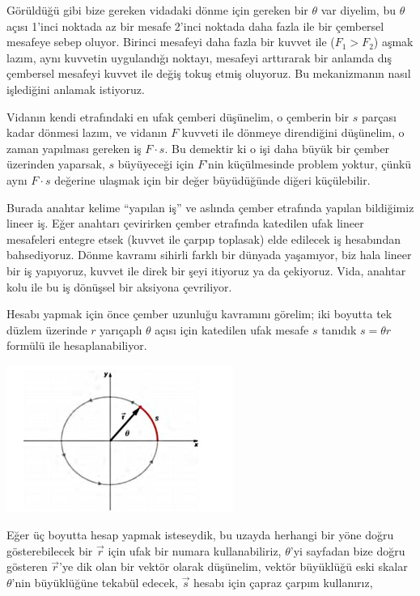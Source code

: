 \documentclass[12pt,fleqn]{article}\usepackage{../../common}
\begin{document}
Görüldüğü gibi bize gereken vidadaki dönme için gereken bir $\theta$ var
diyelim, bu $\theta$ açısı 1'inci noktada az bir mesafe 2'inci noktada daha
fazla ile bir çembersel mesafeye sebep oluyor. Birinci mesafeyi daha fazla bir
kuvvet ile ($F_1 > F_2$) aşmak lazım, aynı kuvvetin uygulandığı noktayı,
mesafeyi arttırarak bir anlamda dış çembersel mesafeyi kuvvet ile değiş tokuş
etmiş oluyoruz. Bu mekanizmanın nasıl işlediğini anlamak istiyoruz.

Vidanın kendi etrafındaki en ufak çemberi düşünelim, o çemberin bir $s$ parçası
kadar dönmesi lazım, ve vidanın $F$ kuvveti ile dönmeye direndiğini düşünelim, o
zaman yapılması gereken iş $F \cdot s$. Bu demektir ki o işi daha büyük bir
çember üzerinden yaparsak, $s$ büyüyeceği için $F$'nin küçülmesinde problem
yoktur, çünkü aynı $F \cdot s$ değerine ulaşmak için bir değer büyüdüğünde
diğeri küçülebilir.

Burada anahtar kelime ``yapılan iş'' ve aslında çember etrafında yapılan
bildiğimiz lineer iş. Eğer anahtarı çevirirken çember etrafında katedilen ufak
lineer mesafeleri entegre etsek (kuvvet ile çarpıp toplasak) elde edilecek iş
hesabından bahsediyoruz. Dönme kavramı sihirli farklı bir dünyada yaşamıyor, biz
hala lineer bir iş yapıyoruz, kuvvet ile direk bir şeyi itiyoruz ya da
çekiyoruz.  Vida, anahtar kolu ile bu iş dönüşsel bir aksiyona çevriliyor.

Hesabı yapmak için önce çember uzunluğu kavramını görelim; iki boyutta tek
düzlem üzerinde $r$ yarıçaplı $\theta$ açısı için katedilen ufak mesafe $s$
tanıdık $s = \theta r$ formülü ile hesaplanabiliyor.

\includegraphics[width=20em]{phy_005_basics_02_06.jpg}

Eğer üç boyutta hesap yapmak isteseydik, bu uzayda herhangi bir yöne doğru
gösterebilecek bir $\vec{r}$ için ufak bir numara kullanabiliriz, $\theta$'yi
sayfadan bize doğru gösteren $\vec{r}$'ye dik olan bir vektör olarak düşünelim,
vektör büyüklüğü eski skalar $\theta$'nin büyüklüğüne tekabül edecek, $\vec{s}$
hesabı için çapraz çarpım kullanırız,
\end{document}
